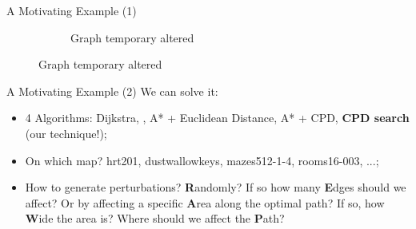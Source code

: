 \begin{frame}{A Motivating Example (1)}
\begin{figure}[ht]
\begin{subfigure}{0.45\linewidth}
            \caption{Graph temporary altered}
            \label{fig:pathfinding:idea:single edgecostschanges:b}
        \end{subfigure}%
    \end{figure}
\end{frame}

\begin{frame}{A Motivating Example (2)}
    We can solve it:
    \begin{itemize}
        \item 4 Algorithms: Dijkstra, , A* + Euclidean Distance, A* + CPD, \textbf{CPD search} (our technique!);
        \item On which map? hrt201, dustwallowkeys, mazes512-1-4, rooms16-003, ...;
        \item How to generate perturbations? \textbf{R}andomly? If so how many \textbf{E}dges should we affect? Or by affecting a specific \textbf{A}rea along the optimal path? If so, how \textbf{W}ide the area is? Where should we affect the \textbf{P}ath?
    \end{itemize}
\end{frame}

